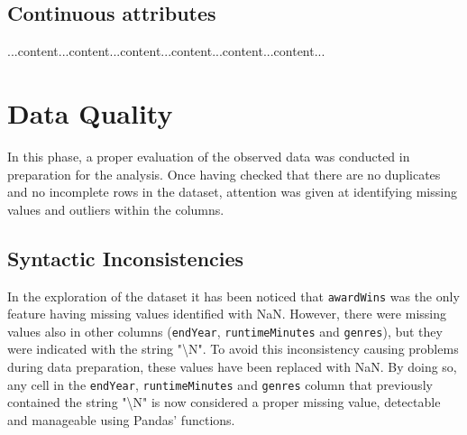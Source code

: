 \subsection{Continuous attributes}
...content...content...content...content...content...content...


\section{Data Quality}\label{sec:data_quality}
In this phase, a proper evaluation of the observed data was conducted in preparation for the analysis.
Once having checked that there are no duplicates and no incomplete rows in the dataset, attention was given at identifying missing values and outliers within the columns.



\subsection{Syntactic Inconsistencies}
In the exploration of the dataset it has been noticed that \texttt{awardWins} was the only feature having missing values identified with NaN.
However, there were missing values also in other columns (\texttt{endYear}, \texttt{runtimeMinutes} and \texttt{genres}), but they were indicated with the string "\textbackslash N".
To avoid this inconsistency causing problems during data preparation, these values have been replaced with NaN.
By doing so, any cell in the \texttt{endYear}, \texttt{runtimeMinutes} and \texttt{genres} column that previously contained the string "\textbackslash N" is now considered a proper missing value, detectable and manageable using Pandas' functions.



